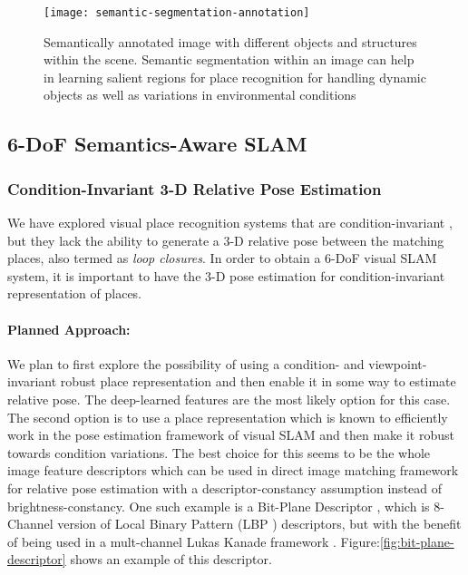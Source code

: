 \documentclass{article}
\begin{document}
\begin{figure}[htbp]
 \centering
 \texttt{[image: semantic-segmentation-annotation]}
 \caption{Semantically annotated image \cite{mottaghi2014role} with different objects and structures within the scene. Semantic segmentation within an image can help in learning salient regions for place recognition for handling dynamic objects as well as variations in environmental conditions}
 \label{fig:semantic-within-example}
\end{figure}

\subsection{6-DoF Semantics-Aware SLAM}

\subsubsection{Condition-Invariant 3-D Relative Pose Estimation}
We have explored visual place recognition systems that are condition-invariant \cite{Milford2012,Niko2015,chen2017deep}, but they lack the ability to generate a 3-D relative pose between the matching places, also termed as \emph{loop closures}. In order to obtain a 6-DoF visual SLAM system, it is important to have the 3-D pose estimation for condition-invariant representation of places.

\paragraph{Planned Approach:}
We plan to first explore the possibility of using a condition- and viewpoint-invariant robust place representation and then enable it in some way to estimate relative pose. The deep-learned features are the most likely option for this case. The second option is to use a place representation which is known to efficiently work in the pose estimation framework of visual SLAM and then make it robust towards condition variations. The best choice for this seems to be the whole image feature descriptors which can be used in direct image matching framework for relative pose estimation with a descriptor-constancy assumption instead of brightness-constancy. One such example is a Bit-Plane Descriptor \cite{alismail2016bit}, which is 8-Channel version of Local Binary Pattern (LBP \cite{ojala1996comparative}) descriptors, but with the benefit of being used in a mult-channel Lukas Kanade framework \cite{alismail2016bit}. Figure:\ref{fig:bit-plane-descriptor} shows an example of this descriptor.
\end{document}
